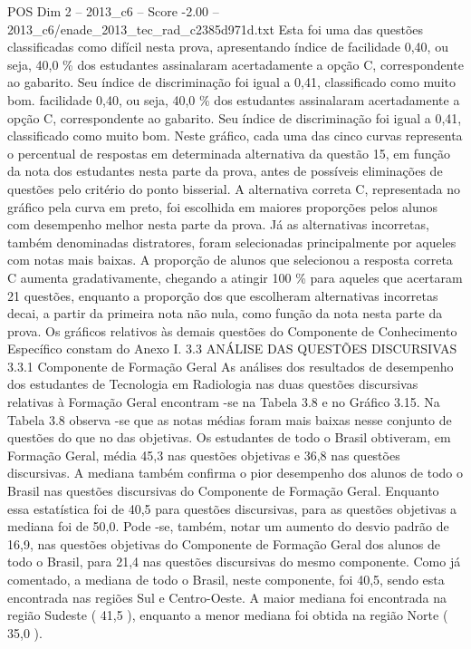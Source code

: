 \begin{textsample}{POS Dim 2 – 2013\_c6 – Score -2.00 – 2013\_c6/enade\_2013\_tec\_rad\_c2385d971d.txt}
Esta foi uma das questões classificadas como difícil nesta prova, apresentando índice de facilidade 0,40, ou seja, 40,0 \% dos estudantes assinalaram acertadamente a opção C, correspondente ao gabarito.
Seu índice de discriminação foi igual a 0,41, classificado como muito bom. facilidade 0,40, ou seja, 40,0 \% dos estudantes assinalaram acertadamente a opção C, correspondente ao gabarito.
Seu índice de discriminação foi igual a 0,41, classificado como muito bom.
Neste gráfico, cada uma das cinco curvas representa o percentual de respostas em determinada alternativa da questão 15, em função da nota dos estudantes nesta parte da prova, antes de possíveis eliminações de questões pelo critério do ponto bisserial.
A alternativa correta C, representada no gráfico pela curva em preto, foi escolhida em maiores proporções pelos alunos com desempenho melhor nesta parte da prova.
Já as alternativas incorretas, também denominadas distratores, foram selecionadas principalmente por aqueles com notas mais baixas.
A proporção de alunos que selecionou a resposta correta C aumenta gradativamente, chegando a atingir 100 \% para aqueles que acertaram 21 questões, enquanto a proporção dos que escolheram alternativas incorretas decai, a partir da primeira nota não nula, como função da nota nesta parte da prova.
Os gráficos relativos às demais questões do Componente de Conhecimento Específico constam do Anexo I. 3.3 ANÁLISE DAS QUESTÕES DISCURSIVAS 3.3.1 Componente de Formação Geral As análises dos resultados de desempenho dos estudantes de Tecnologia em Radiologia nas duas questões discursivas relativas à Formação Geral encontram -se na Tabela 3.8 e no Gráfico 3.15.
Na Tabela 3.8 observa -se que as notas médias foram mais baixas nesse conjunto de questões do que no das objetivas.
Os estudantes de todo o Brasil obtiveram, em Formação Geral, média 45,3 nas questões objetivas e 36,8 nas questões discursivas.
A mediana também confirma o pior desempenho dos alunos de todo o Brasil nas questões discursivas do Componente de Formação Geral.
Enquanto essa estatística foi de 40,5 para questões discursivas, para as questões objetivas a mediana foi de 50,0.
Pode -se, também, notar um aumento do desvio padrão de 16,9, nas questões objetivas do Componente de Formação Geral dos alunos de todo o Brasil, para 21,4 nas questões discursivas do mesmo componente.
Como já comentado, a mediana de todo o Brasil, neste componente, foi 40,5, sendo esta encontrada nas regiões Sul e Centro-Oeste.
A maior mediana foi encontrada na região Sudeste ( 41,5 ), enquanto a menor mediana foi obtida na região Norte ( 35,0 ).

\end{textsample}
